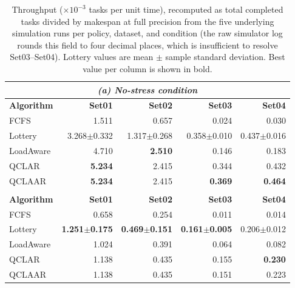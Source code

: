 \documentclass[preprint,12pt]{elsarticle}
\begin{document}
\begin{table}[htbp]
\centering
\caption{Throughput ($\times 10^{-3}$ tasks per unit time), recomputed as
total completed tasks divided by makespan at full precision from the five
underlying simulation runs per policy, dataset, and condition (the raw
simulator log rounds this field to four decimal places, which is insufficient
to resolve Set03--Set04). Lottery values are mean $\pm$ sample standard
deviation. Best value per column is shown in bold.}
\label{tab:throughput}
\small
\setlength{\tabcolsep}{6pt}
\begin{tabular}{lrrrr}
\multicolumn{5}{c}{\textit{(a) No-stress condition}} \\
\toprule
\textbf{Algorithm} & \textbf{Set01} & \textbf{Set02} & \textbf{Set03} & \textbf{Set04} \\
\midrule
FCFS      & 1.511            & 0.657            & 0.024            & 0.030 \\
Lottery   & 3.268$\pm$0.332  & 1.317$\pm$0.268  & 0.358$\pm$0.010  & 0.437$\pm$0.016 \\
LoadAware & 4.710            & \textbf{2.510}   & 0.146            & 0.183 \\
QCLAR     & \textbf{5.234}   & 2.415            & 0.344            & 0.432 \\
QCLAAR    & \textbf{5.234}   & 2.415            & \textbf{0.369}   & \textbf{0.464} \\
\bottomrule
\addlinespace[1.2ex]
\multicolumn{5}{c}{\textit{(b) Stress condition}} \\
\toprule
\textbf{Algorithm} & \textbf{Set01} & \textbf{Set02} & \textbf{Set03} & \textbf{Set04} \\
\midrule
FCFS      & 0.658                  & 0.254                  & 0.011                  & 0.014 \\
Lottery   & \textbf{1.251$\pm$0.175} & \textbf{0.469$\pm$0.151} & \textbf{0.161$\pm$0.005} & 0.206$\pm$0.012 \\
LoadAware & 1.024                  & 0.391                  & 0.064                  & 0.082 \\
QCLAR     & 1.138                  & 0.435                  & 0.155                  & \textbf{0.230} \\
QCLAAR    & 1.138                  & 0.435                  & 0.151                  & 0.223 \\
\bottomrule
\end{tabular}
\end{table}
\end{document}
